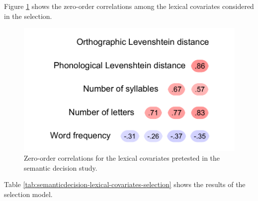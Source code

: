\documentclass[
  12pt,
  man,floatsintext]{apa7}
\begin{document}
Figure \ref{fig:semanticdecision-lexical-covariates-correlations} shows the zero-order correlations among the lexical covariates considered in the selection.

\begin{figure}

{\centering \includegraphics[width=0.5\linewidth]{manuscript_files/figure-latex/semanticdecision-lexical-covariates-correlations-1} 

}

\caption{Zero-order correlations for the lexical covariates pretested in the semantic decision study.}\label{fig:semanticdecision-lexical-covariates-correlations}
\end{figure}

Table \ref{tab:semanticdecision-lexical-covariates-selection} shows the results of the selection model.
\end{document}
